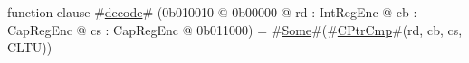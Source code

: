 function clause #\hyperref[sailMIPSzdecode]{decode}# (0b010010 @ 0b00000 @ rd : IntRegEnc @ cb : CapRegEnc @ cs : CapRegEnc @ 0b011000) = #\hyperref[sailMIPSzSome]{Some}#(#\hyperref[sailMIPSzCPtrCmp]{CPtrCmp}#(rd, cb, cs, CLTU))
